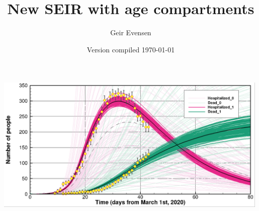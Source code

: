 \documentclass[twoside,11pt]{article}
\begin{document}
\setlength{\parskip}{3mm} 

\title{New SEIR with age compartments }
\author{Geir Evensen}

\date{Version compiled \today}

\maketitle


\begin{center}
\includegraphics[width=0.99\textwidth]{closed.png}
\end{center}

\newpage
\end{document}
